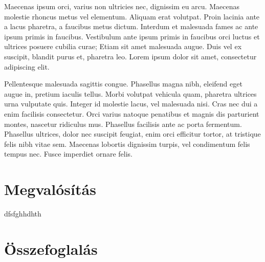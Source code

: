 \documentclass[a4paper,12pt,oneside]{report}
\begin{document}
Maecenas ipsum orci, varius non ultricies nec, dignissim eu arcu. Maecenas
molestie rhoncus metus vel elementum. Aliquam erat volutpat. Proin lacinia ante
a lacus pharetra, a faucibus metus dictum. Interdum et malesuada fames ac ante
ipsum primis in faucibus. Vestibulum ante ipsum primis in faucibus orci luctus
et ultrices posuere cubilia curae; Etiam sit amet malesuada augue. Duis vel ex
suscipit, blandit purus et, pharetra leo. Lorem ipsum dolor sit amet,
consectetur adipiscing elit.

Pellentesque malesuada sagittis congue. Phasellus magna nibh, eleifend eget
augue in, pretium iaculis tellus. Morbi volutpat vehicula quam, pharetra
ultrices urna vulputate quis. Integer id molestie lacus, vel malesuada nisi.
Cras nec dui a enim facilisis consectetur. Orci varius natoque penatibus et
magnis dis parturient montes, nascetur ridiculus mus. Phasellus facilisis ante
ac porta fermentum. Phasellus ultrices, dolor nec suscipit feugiat, enim orci
efficitur tortor, at tristique felis nibh vitae sem. Maecenas lobortis
dignissim turpis, vel condimentum felis tempus nec. Fusce imperdiet ornare
felis.

\chapter{Megvalósítás}

dfsfghhdhth
\chapter{Összefoglalás}
\end{document}
